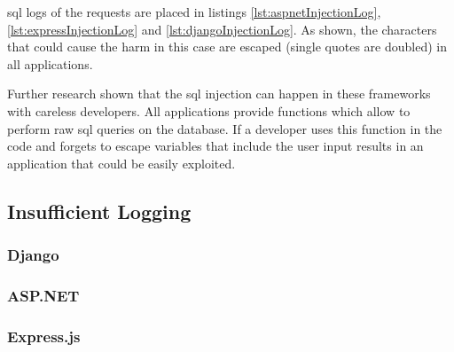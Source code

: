 \acrshort{sql} logs of the requests are placed in listings \ref{lst:aspnetInjectionLog}, \ref{lst:expressInjectionLog} and \ref{lst:djangoInjectionLog}. As shown, the characters that could cause the harm in this case are escaped (single quotes are doubled) in all applications.




Further research shown that the \acrshort{sql} injection can happen in these frameworks with careless developers. All applications provide functions which allow to perform raw \acrshort{sql} queries on the database. If a developer uses this function in the code and forgets to escape variables that include the user input results in an application that could be easily exploited.

\subsection{Insufficient Logging}
\subsubsection{Django}
\subsubsection{ASP.NET}
\subsubsection{Express.js}

